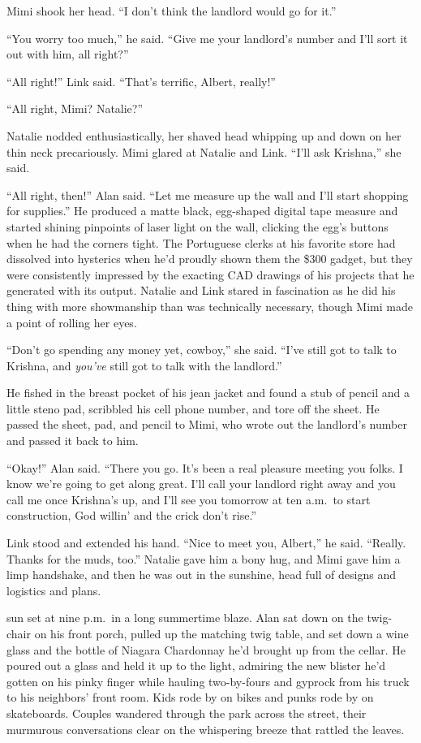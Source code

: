 Mimi shook her head.  ``I don't think the landlord would go for it.''

``You worry too much,'' he said.  ``Give me your landlord's number and
I'll sort it out with him, all right?''

``All right!'' Link said.  ``That's terrific, Albert, really!''

``All right, Mimi?  Natalie?''

Natalie nodded enthusiastically, her shaved head whipping up and down
on her thin neck precariously.  Mimi glared at Natalie and Link. 
``I'll ask Krishna,'' she said.

``All right, then!'' Alan said.  ``Let me measure up the wall and I'll
start shopping for supplies.'' He produced a matte black, egg-shaped
digital tape measure and started shining pinpoints of laser light on
the wall, clicking the egg's buttons when he had the corners tight. 
The Portuguese clerks at his favorite store had dissolved into
hysterics when he'd proudly shown them the \$300 gadget, but they were
consistently impressed by the exacting CAD drawings of his projects
that he generated with its output.  Natalie and Link stared in
fascination as he did his thing with more showmanship than was
technically necessary, though Mimi made a point of rolling her eyes.

``Don't go spending any money yet, cowboy,'' she said.  ``I've still
got to talk to Krishna, and \textit{you've} still got to talk with the
landlord.''

He fished in the breast pocket of his jean jacket and found a stub of
pencil and a little steno pad, scribbled his cell phone number, and
tore off the sheet.  He passed the sheet, pad, and pencil to Mimi, who
wrote out the landlord's number and passed it back to him.

``Okay!'' Alan said.  ``There you go.  It's been a real pleasure
meeting you folks.  I know we're going to get along great.  I'll call
your landlord right away and you call me once Krishna's up, and I'll
see you tomorrow at ten a.m.\  to start construction, God willin' and
the crick don't rise.''

Link stood and extended his hand.  ``Nice to meet you, Albert,'' he
said.  ``Really.  Thanks for the muds, too.'' Natalie gave him a bony
hug, and Mimi gave him a limp handshake, and then he was out in the
sunshine, head full of designs and logistics and plans.

 sun set at nine p.m.\  in a long summertime blaze.  Alan sat down
on the twig-chair on his front porch, pulled up the matching twig
table, and set down a wine glass and the bottle of Niagara Chardonnay
he'd brought up from the cellar.  He poured out a glass and held it up
to the light, admiring the new blister he'd gotten on his pinky finger
while hauling two-by-fours and gyprock from his truck to his
neighbors' front room.  Kids rode by on bikes and punks rode by on
skateboards.  Couples wandered through the park across the street,
their murmurous conversations clear on the whispering breeze that
rattled the leaves.


